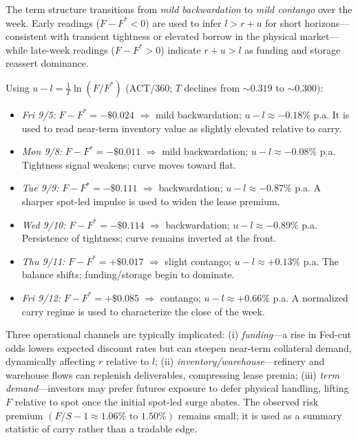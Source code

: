 \documentclass[11pt,a4paper]{article} %
\begin{document}
The term structure transitions from \emph{mild backwardation} to \emph{mild contango} over the week. Early readings (\(F-F^{*}<0\)) are used to infer \(l>r+u\) for short horizons—consistent with transient tightness or elevated borrow in the physical market—while late-week readings (\(F-F^{*}>0\)) indicate \(r+u>l\) as funding and storage reassert dominance.


Using \(u-l=\frac{1}{T}\ln(F/F^{*})\) (ACT/360; \(T\) declines from \(\sim 0.319\) to \(\sim 0.300\)):
\begin{itemize}
  \item \textit{Fri 9/5:} \(F-F^{*}=-\$0.024\) \(\Rightarrow\) mild backwardation; \(u-l\approx-0.18\%\) p.a. It is used to read near-term inventory value as slightly elevated relative to carry.
  \item \textit{Mon 9/8:} \(F-F^{*}=-\$0.011\) \(\Rightarrow\) mild backwardation; \(u-l\approx-0.08\%\) p.a. Tightness signal weakens; curve moves toward flat.
  \item \textit{Tue 9/9:} \(F-F^{*}=-\$0.111\) \(\Rightarrow\) backwardation; \(u-l\approx-0.87\%\) p.a. A sharper spot-led impulse is used to widen the lease premium.
  \item \textit{Wed 9/10:} \(F-F^{*}=-\$0.114\) \(\Rightarrow\) backwardation; \(u-l\approx-0.89\%\) p.a. Persistence of tightness; curve remains inverted at the front.
  \item \textit{Thu 9/11:} \(F-F^{*}=+\$0.017\) \(\Rightarrow\) slight contango; \(u-l\approx+0.13\%\) p.a. The balance shifts; funding/storage begin to dominate.
  \item \textit{Fri 9/12:} \(F-F^{*}=+\$0.085\) \(\Rightarrow\) contango; \(u-l\approx+0.66\%\) p.a. A normalized carry regime is used to characterize the close of the week.
\end{itemize}


Three operational channels are typically implicated: (i) \emph{funding}—a rise in Fed-cut odds lowers expected discount rates but can steepen near-term collateral demand, dynamically affecting \(r\) relative to \(l\); (ii) \emph{inventory/warehouse}—refinery and warehouse flows can replenish deliverables, compressing lease premia; (iii) \emph{term demand}—investors may prefer futures exposure to defer physical handling, lifting \(F\) relative to spot once the initial spot-led surge abates. The observed risk premium \((F/S-1\approx 1.06\% \text{ to } 1.50\%)\) remains small; it is used as a summary statistic of carry rather than a tradable edge.
\end{document}
